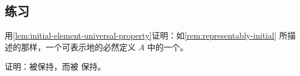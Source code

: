 \subsection*{练习}

\begin{exercise}\label{ex:representably-initial-element}
用\cref{lem:initial-element-universal-property}证明：如\cref{rem:representably-initial}
所描述的那样，一个可表示地\trInitial{}的\trElement{}必然定义 $A$ 中的一个\trInitial{}\trElement{}。
\end{exercise}

\begin{exercise}\label{ex:preserved-by-adjoints}
证明：\trInitial{}\trElement{}被\trLeftAdjoint{}保持，而\trTerminal{}\trElement{}被%
\trRightAdjoint{}保持。
\end{exercise}
